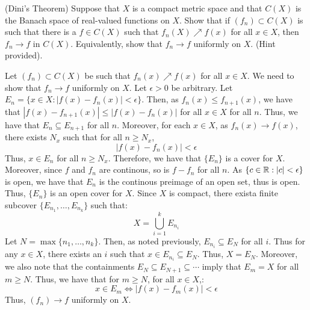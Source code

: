 \documentclass[12pt]{article}
\begin{document}
\begin{problem}{65}(Dini's Theorem)
    Suppose that $X$ is a compact metric space and that $C(X)$ is the Banach space of real-valued functions on $X$. Show that if $(f_n) \subset C(X)$ is such that there is a $f \in C(X)$ such that $f_n(X) \nearrow f(x)$ for all $x \in X$, then $f_n \to f$ in $C(X)$. Equivalently, show that $f_n \to f$ uniformly on $X$. (Hint provided).
\end{problem}
\begin{solution}
    Let $(f_n) \subset C(X)$ be such that $f_n(x) \nearrow f(x)$ for all $x \in X$. We need to show that $f_n \to f$ uniformly on $X$. \bbni
    Let $\epsilon > 0$ be arbitrary. 
    Let $E_n = \{ x \in X : |f(x)-f_n(x)| < \epsilon\}$. Then, as $f_{n}(x) \leq f_{n+1}(x)$, we have that $|f(x) - f_{n+1}(x)| \leq |f(x) - f_n(x)|$ for all $x \in X$ for all $n$. Thus, we have that $E_n \subseteq E_{n+1}$ for all $n$. Moreover, for each $x \in X$, as $f_n(x) \to f(x)$, there exists $N_x$ such that for all $n \geq N_x$,
    \[ |f(x) -f_n(x)| < \epsilon\]
    Thus, $x \in E_n$ for all $n \geq N_x$. Therefore, we have that $\{E_n\}$ is a cover for $X$. \bbni
    Moreover, since $f$ and $f_n$ are continous, so is $f-f_n$ for all $n$. As $\{c \in \mathbb R : |c| < \epsilon\}$ is open, we have that $E_n$ is the continous preimage of an open set, thus is open. Thus, $\{E_n\}$ is an open cover for $X$. \bbni
    Since $X$ is compact, there exista finite subcover $\{E_{n_1}, \ldots, E_{n_k}\}$ such that:
    \[ X = \bigcup_{i=1}^k E_{n_i}\]
    Let $N = \max\{n_1, \ldots, n_k\}$. Then, as noted previously, $E_{n_i} \subseteq E_N$ for all $i$. Thus for any $x \in X$, there exists an $i$ such that $x \in E_{n_i} \subseteq E_N$. Thus, $X = E_N$. \bbni
    Moreover, we also note that the containments $E_N \subseteq E_{N+1} \subseteq \cdots$ imply that $E_m = X$ for all $m \geq N$. Thus, we have that for $m \geq N$, for all $x \in X$,:
    \[ x\in E_m \iff |f(x) - f_m(x)| < \epsilon\]
    Thus, $(f_n) \to f$ uniformly on $X$.
\end{solution}
\newpage
\end{document}
